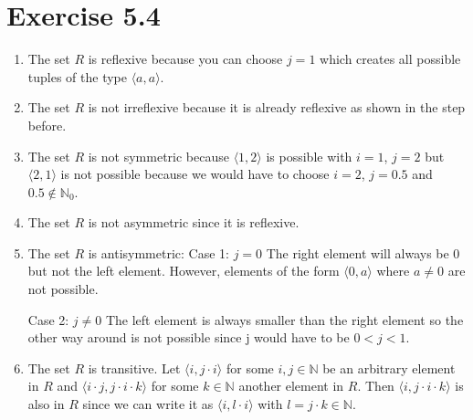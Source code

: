 \documentclass{article} %
\newcommand{\homeworkNumber}{5}
\begin{document}
\section*{Exercise \homeworkNumber.4}
\begin{enumerate}[-]
\item The set $R$ is reflexive because you can choose $j = 1$ which creates all possible tuples of the type $\langle a, a \rangle$.

\item The set $R$ is not irreflexive because it is already reflexive as shown in the step before.

\item The set $R$ is not symmetric because $\langle 1, 2 \rangle$ is possible with $i = 1$, $j = 2$ but $\langle 2, 1 \rangle$ is not possible because we would have to choose $i = 2$, $j = 0.5$ and $0.5 \notin \mathbb{N}_0$.

\item The set $R$ is not asymmetric since it is reflexive.

\item The set $R$ is antisymmetric: \newline
Case 1: $j = 0$ \newline 
The right element will always be 0 but not the left element.
However, elements of the form $\langle 0, a \rangle$ where $a \neq 0$ are not possible.


Case 2: $j \neq 0$ \newline The left element is always smaller than the right element so the other way around is not possible since j would have to be $0 < j < 1$.

\item The set $R$ is transitive. Let $\langle i, j \cdot i \rangle$ for some $i,j \in \mathbb{N}$ be an arbitrary element in $R$ and  
$\langle i \cdot j, j \cdot i \cdot k \rangle$ for some $k \in \mathbb{N}$ another element in $R$. Then 
$\langle i, j \cdot i \cdot k \rangle$ is also in $R$ since we can write it as $\langle i, l \cdot i \rangle$ with $l = j \cdot k \in \mathbb{N}$.


\end{enumerate}
\end{document}
